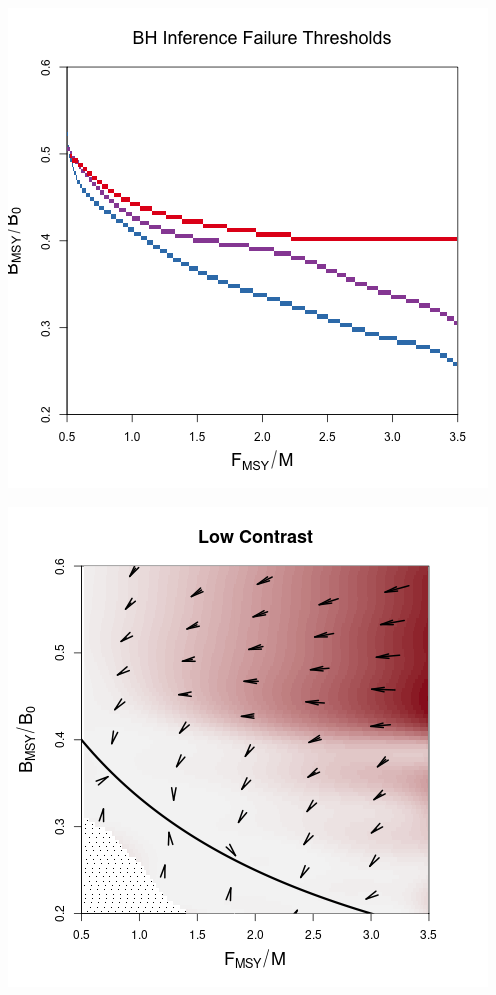 \documentclass[a0paper,portrait]{baposter}
\begin{document}
\begin{poster}
{\begin{minipage}[h!]{0.61\textwidth}
        	\begin{minipage}[h!]{0.73\textwidth}
        	\includegraphics[width=\textwidth]{../../ddBias/relErrorImagesBHDD0.5.png}
		\end{minipage}
		\begin{minipage}[h!]{0.24\textwidth}
		\includegraphics[width=\textwidth]{../../ddBias/directionalBiasDDSubFlatT45N150A0-1AS0.1K10N56Reds 2.png}\\

\end{minipage}
\end{minipage}}
\end{poster}
\end{document}

